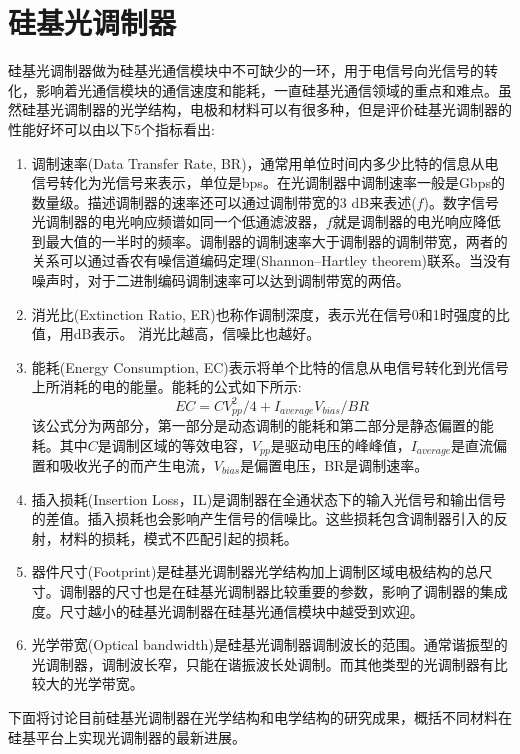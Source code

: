 \section{硅基光调制器}
硅基光调制器做为硅基光通信模块中不可缺少的一环，用于电信号向光信号的转化，影响着光通信模块的通信速度和能耗，一直硅基光通信领域的重点和难点。虽然硅基光调制器的光学结构，电极和材料可以有很多种，但是评价硅基光调制器的性能好坏可以由以下5个指标看出:
\begin{enumerate}[(1)]
	\item 调制速率(Data Transfer Rate, BR)，通常用单位时间内多少比特的信息从电信号转化为光信号来表示，单位是bps。在光调制器中调制速率一般是Gbps的数量级。描述调制器的速率还可以通过调制带宽的3 dB来表述($f$)。数字信号光调制器的电光响应频谱如同一个低通滤波器，$f$就是调制器的电光响应降低到最大值的一半时的频率。调制器的调制速率大于调制器的调制带宽，两者的关系可以通过香农有噪信道编码定理(Shannon–Hartley theorem)联系。当没有噪声时，对于二进制编码调制速率可以达到调制带宽的两倍。
	\item 消光比(Extinction Ratio, ER)也称作调制深度，表示光在信号0和1时强度的比值，用dB表示。 消光比越高，信噪比也越好。
	\item 能耗(Energy Consumption, EC)表示将单个比特的信息从电信号转化到光信号上所消耗的电的能量。能耗的公式如下所示:
		\begin{equation}
		\label{Equ:EC}
		EC = CV_{pp}^{2}/4 + I_{average}V_{bias}/BR
		\end{equation}
	该公式分为两部分，第一部分是动态调制的能耗和第二部分是静态偏置的能耗。其中$C$是调制区域的等效电容，$V_{pp}$是驱动电压的峰峰值，$I_{average}$是直流偏置和吸收光子的而产生电流，$V_{bias}$是偏置电压，BR是调制速率。
	\item 插入损耗(Insertion Loss，IL)是调制器在全通状态下的输入光信号和输出信号的差值。插入损耗也会影响产生信号的信噪比。这些损耗包含调制器引入的反射，材料的损耗，模式不匹配引起的损耗。
	\item 器件尺寸(Footprint)是硅基光调制器光学结构加上调制区域电极结构的总尺寸。调制器的尺寸也是在硅基光调制器比较重要的参数，影响了调制器的集成度。尺寸越小的硅基光调制器在硅基光通信模块中越受到欢迎。
	\item 光学带宽(Optical bandwidth)是硅基光调制器调制波长的范围。通常谐振型的光调制器，调制波长窄，只能在谐振波长处调制。而其他类型的光调制器有比较大的光学带宽。	
\end{enumerate}

下面将讨论目前硅基光调制器在光学结构和电学结构的研究成果，概括不同材料在硅基平台上实现光调制器的最新进展。
